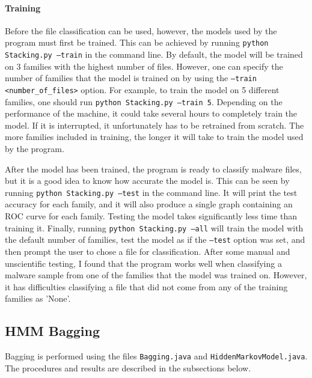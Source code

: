 \documentclass[12pt]{article}
\begin{document}
  \paragraph{Training}
Before the file classification can be used, however, the models used by the program must first be trained. This can be achieved by running  \texttt{python Stacking.py --train} in the command line. By default, the model will be trained on 3 families with the highest number of files. However, one can specify the number of families that the model is trained on by using the \texttt{--train <number\_of\_files>} option. For example, to train the model on 5 different families, one should run \texttt{python Stacking.py --train 5}. Depending on the performance of the machine, it could take several hours to completely train the model. If it is interrupted, it unfortunately has to be retrained from scratch. The more families included in training, the longer it will take to train the model used by the program. 

After the model has been trained, the program is ready to classify malware files, but it is a good idea to know how accurate the model is. This can be seen by running  \texttt{python Stacking.py --test} in the command line. It will print the test accuracy for each family, and it will also produce a single graph containing an ROC curve for each family. Testing the model takes significantly less time than training it.
Finally, running  \texttt{python Stacking.py --all} will train the model with the default number of families, test the model as if the \texttt{--test} option was set, and then prompt the user to chose a file for classification. After some manual and unscientific testing, I found that the program works well when classifying a malware sample from one of the families that the model was trained on. However, it has difficulties classifying a file that did not come from any of the training families as 'None'.




\subsection{HMM Bagging}
  Bagging is performed using the files \texttt{Bagging.java} and \texttt{HiddenMarkovModel.java}. The procedures and results are described in the subsections below.
\end{document}
